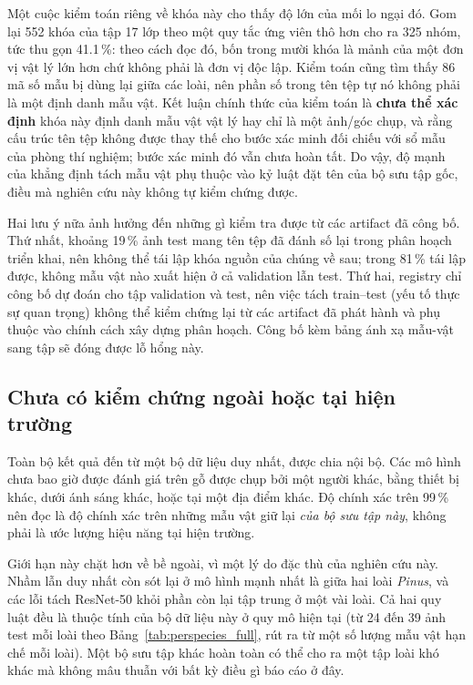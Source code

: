 Một cuộc kiểm toán riêng về khóa này cho thấy độ lớn của mối lo ngại đó. Gom
lại 552 khóa của tập 17 lớp theo một quy tắc ứng viên thô hơn cho ra 325 nhóm,
tức thu gọn 41.1\,\%: theo cách đọc đó, bốn trong mười khóa là mảnh của một đơn
vị vật lý lớn hơn chứ không phải là đơn vị độc lập. Kiểm toán cũng tìm thấy 86
mã số mẫu bị dùng lại giữa các loài, nên phần số trong tên tệp tự nó không phải
là một định danh mẫu vật. Kết luận chính thức của kiểm toán là \textbf{chưa thể
xác định} khóa này định danh mẫu vật vật lý hay chỉ là một ảnh/góc chụp, và
rằng cấu trúc tên tệp không được thay thế cho bước xác minh đối chiếu với sổ
mẫu của phòng thí nghiệm; bước xác minh đó vẫn chưa hoàn tất. Do vậy, độ mạnh
của khẳng định tách mẫu vật phụ thuộc vào kỷ luật đặt tên của bộ sưu tập gốc,
điều mà nghiên cứu này không tự kiểm chứng được.

Hai lưu ý nữa ảnh hưởng đến những gì kiểm tra được từ các artifact đã công bố.
Thứ nhất, khoảng 19\,\% ảnh test mang tên tệp đã đánh số lại trong phân hoạch
triển khai, nên không thể tái lập khóa nguồn của chúng về sau; trong 81\,\% tái
lập được, không mẫu vật nào xuất hiện ở cả validation lẫn test. Thứ hai,
registry chỉ công bố dự đoán cho tập validation và test, nên việc tách
train--test (yếu tố thực sự quan trọng) không thể kiểm chứng lại từ các
artifact đã phát hành và phụ thuộc vào chính cách xây dựng phân hoạch. Công bố
kèm bảng ánh xạ mẫu-vật sang tập sẽ đóng được lỗ hổng này.

\subsection{Chưa có kiểm chứng ngoài hoặc tại hiện trường}
\label{vi:sec:discussion:external}

Toàn bộ kết quả đến từ một bộ dữ liệu duy nhất, được chia nội bộ. Các mô hình
chưa bao giờ được đánh giá trên gỗ được chụp bởi một người khác, bằng thiết bị
khác, dưới ánh sáng khác, hoặc tại một địa điểm khác. Độ chính xác trên
99\,\% nên đọc là độ chính xác trên những mẫu vật giữ lại \emph{của bộ sưu tập
này}, không phải là ước lượng hiệu năng tại hiện trường.

Giới hạn này chặt hơn về bề ngoài, vì một lý do đặc thù của nghiên cứu này.
Nhầm lẫn duy nhất còn sót lại ở mô hình mạnh nhất là giữa hai loài
\textit{Pinus}, và các lỗi tách ResNet-50 khỏi phần còn lại tập trung ở một vài
loài. Cả hai quy luật đều là thuộc tính của bộ dữ liệu này ở quy mô hiện tại
(từ 24 đến 39 ảnh test mỗi loài theo Bảng~\ref{tab:perspecies_full}, rút ra từ
một số lượng mẫu vật hạn chế mỗi
loài). Một bộ sưu tập khác hoàn toàn có thể cho ra một tập loài khó khác mà
không mâu thuẫn với bất kỳ điều gì báo cáo ở đây.


